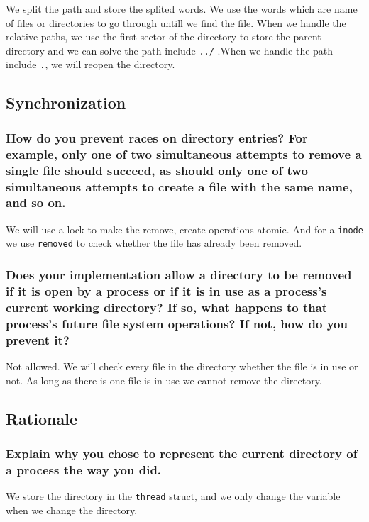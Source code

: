 \documentclass[sigconf, nonacm, balance=false, urlbreakonhyphens=true]{acmart}
\begin{document}
                We split the path and store the splited words. We use the words which are name of files or directories to go through untill we find the file. When we handle the relative paths, we use the first sector of the directory to store the parent directory and we can solve the path include \texttt{../} .When we handle the path include \texttt{.}, we will reopen the directory.
                
        
        \subsection{Synchronization}

            \subsubsection{How do you prevent races on directory entries?  For example, only one of two simultaneous attempts to remove a single file should succeed, as should only one of two simultaneous attempts to create a file with the same name, and so on. } 

	We will use a lock to make the remove, create operations atomic. And for a \texttt{inode} we  use \texttt{removed} to check whether the file has already been removed.


            \subsubsection{Does your implementation allow a directory to be removed if it is open by a process or if it is in use as a process's current working directory?  If so, what happens to that process's future file system operations?  If not, how do you prevent it? }
        
	Not allowed. We will check every file in the directory whether the file is in use or not. As long as there is one file is in use we cannot remove the directory.
        \subsection{Rationale}

            \subsubsection{Explain why you chose to represent the current directory of a process the way you did. }

    We store the directory in the \texttt{thread} struct, and  we only change the variable when we change the directory.
\end{document}
